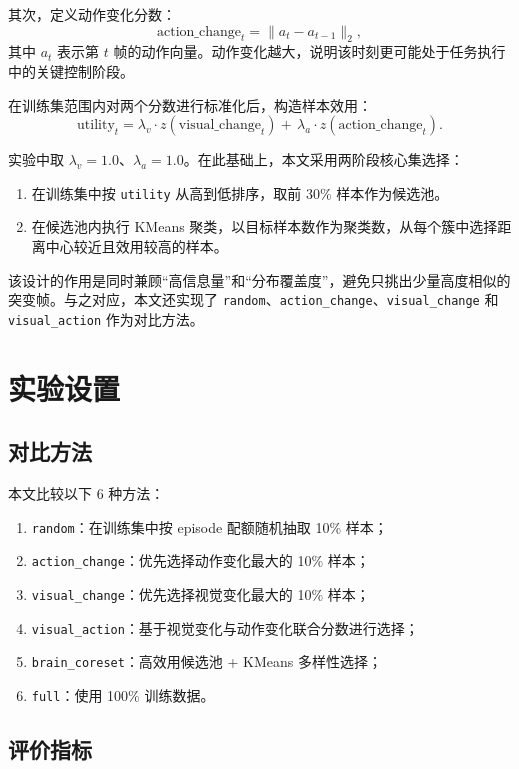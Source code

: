 \documentclass[UTF8,a4paper,12pt]{ctexart}
\begin{document}
其次，定义动作变化分数：
\[
\text{action\_change}_t = \lVert a_t - a_{t-1} \rVert_2,
\]
其中 $a_t$ 表示第 $t$ 帧的动作向量。动作变化越大，说明该时刻更可能处于任务执行中的关键控制阶段。

在训练集范围内对两个分数进行标准化后，构造样本效用：
\[
\text{utility}_t
= \lambda_v \cdot z(\text{visual\_change}_t)
 +\,
  \lambda_a \cdot z(\text{action\_change}_t).
\]

实验中取 $\lambda_v = 1.0$、$\lambda_a = 1.0$。在此基础上，本文采用两阶段核心集选择：
\begin{enumerate}
  \item 在训练集中按 \texttt{utility} 从高到低排序，取前 30\% 样本作为候选池。
  \item 在候选池内执行 KMeans 聚类，以目标样本数作为聚类数，从每个簇中选择距离中心较近且效用较高的样本。
\end{enumerate}

该设计的作用是同时兼顾“高信息量”和“分布覆盖度”，避免只挑出少量高度相似的突变帧。与之对应，本文还实现了 \texttt{random}、\texttt{action\_change}、\texttt{visual\_change} 和 \texttt{visual\_action} 作为对比方法。

\section{实验设置}

\subsection{对比方法}

本文比较以下 6 种方法：
\begin{enumerate}
  \item \texttt{random}：在训练集中按 episode 配额随机抽取 10\% 样本；
  \item \texttt{action\_change}：优先选择动作变化最大的 10\% 样本；
  \item \texttt{visual\_change}：优先选择视觉变化最大的 10\% 样本；
  \item \texttt{visual\_action}：基于视觉变化与动作变化联合分数进行选择；
  \item \texttt{brain\_coreset}：高效用候选池 + KMeans 多样性选择；
  \item \texttt{full}：使用 100\% 训练数据。
\end{enumerate}

\subsection{评价指标}
\end{document}
